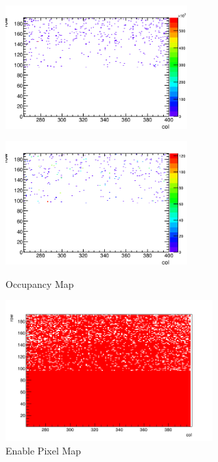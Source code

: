 \begin{figure}[h]
  \centering
  \begin{minipage}[b]{0.45\linewidth}
    \centering
    \includegraphics[width=7cm]{./figure/Noisebf.png}
    \label{fig:bfnoise}
  \end{minipage}
  \begin{minipage}[b]{0.45\linewidth}
    \centering
    \includegraphics[width=7cm]{./figure/Noiseaf.png}
    \label{fig:afnoise}
  \end{minipage}
  \caption{Occupancy Map}
  \label{fig:NoiseOcc}
\end{figure}

\begin{figure}[h]
  \centering
  \includegraphics[width=8cm]{./figure/EnablePix.png}
  \caption{Enable Pixel Map}
  \label{fig:enablepix}
\end{figure}


